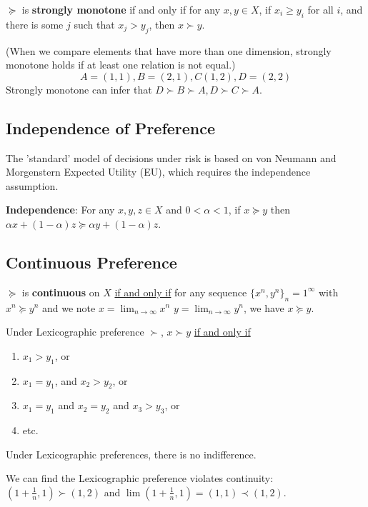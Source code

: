 \documentclass[11pt]{elegantbook}
\begin{document}
\begin{definition}
    \normalfont
    $\succeq$ is \textbf{strongly monotone} if and only if for any $x, y \in X$, if $x_{i} \geq y_{i}$ for all $i$, and there is some $j$ such that $x_{j}>y_{j}$, then $x \succ y$.
\end{definition}
(When we compare elements that have more than one dimension, strongly monotone holds if at least one relation is not equal.)
$$
A=(1,1), B=(2,1), C(1,2), D=(2,2)
$$
Strongly monotone can infer that $D \succ B \succ A, D \succ C \succ A$.

\subsection{Independence of Preference}
The 'standard' model of decisions under risk is based on von Neumann and Morgenstern Expected Utility (EU), which requires the independence assumption.
\begin{definition}
    \normalfont
    \textbf{Independence}: For any $x,y,z\in X$ and $0<\alpha<1$, if $x\succeq y$ then $\alpha x+(1-\alpha)z \succeq \alpha y+(1-\alpha)z$.
\end{definition}



\subsection{Continuous Preference}
\begin{definition}
    \normalfont
    $\succeq$ is \textbf{continuous} on $X$ \underline{if and only if} for any sequence $\{x^n,y^n\}_n=1^\infty$ with $x^n\succeq y^n$ and we note $x=\lim_{n \rightarrow \infty}x^n$ $y=\lim_{n \rightarrow \infty}y^n$, we have $x\succeq y$.
\end{definition}
\begin{example}
    Under Lexicographic preference $\succ$, $x \succ y$ \underline{if and only if}
    \begin{enumerate}[$\circ$]
        \item $x_{1}>y_{1}$, or
        \item $x_{1}=y_{1}$, and $x_{2}>y_{2}$, or
        \item $x_{1}=y_{1}$ and $x_{2}=y_{2}$ and $x_{3}>y_{3}$, or
        \item etc.
    \end{enumerate}
    Under Lexicographic preferences, there is no indifference.
    
    We can find the Lexicographic preference violates continuity: $\left(1+\frac{1}{n}, 1\right) \succ(1,2)$ and $\lim \left(1+\frac{1}{n}, 1\right)=(1,1) \prec(1,2)$.
\end{example}
\end{document}
